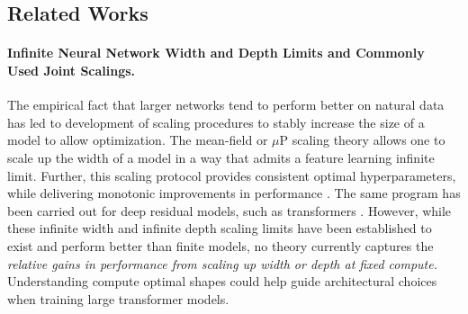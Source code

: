 \documentclass{article} %
\begin{document}
\vspace{-10pt}
\subsection{Related Works}

\vspace{-7pt}

\paragraph{Infinite Neural Network Width and Depth Limits and Commonly Used Joint Scalings.} The empirical fact that larger networks tend to perform better on natural data \citep{hestness2017deep,kaplan2020scaling,hoffmann2022training} has led to development of scaling procedures to stably increase the size of a model to allow optimization. The mean-field or $\mu$P scaling theory \citep{geiger2020disentangling, mei2018mean, chizat2018global, yang2021tensor, bordelon2022self} allows one to scale up the width of a model in a way that admits a feature learning infinite limit. Further, this scaling protocol provides consistent optimal hyperparameters, while delivering monotonic improvements in performance \citep{yang2021tuning}. The same program has been carried out for deep residual models, such as transformers \citep{bordelon2023depthwise, yang2023tensor, bordelon2024infinite, dey2025don}. However, while these infinite width and infinite depth scaling limits have been established to exist and perform better than finite models, no theory currently captures the \textit{relative gains in performance from scaling up width or depth at fixed compute.}  Understanding compute optimal shapes could help guide architectural choices when training large transformer models.


\vspace{-8pt}
\end{document}
